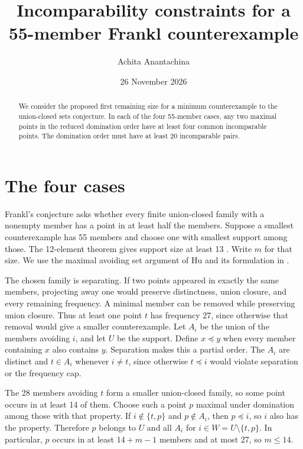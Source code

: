 \documentclass[10pt]{article}
\title{Incomparability constraints for a 55-member Frankl counterexample}
\author{Achita Anantachina}
\date{26 November 2026}
\begin{document}
\maketitle
\begin{abstract}
We consider the proposed first remaining size for a minimum
counterexample to the union-closed sets conjecture. In each of the
four 55-member cases, any two maximal points in the reduced domination
order have at least four common incomparable points. The domination
order must have at least 20 incomparable pairs.
\end{abstract}

\section{The four cases}
Frankl's conjecture asks whether every finite union-closed family with
a nonempty member has a point in at least half the members. Suppose a
smallest counterexample has 55 members and choose one with smallest
support among those. The 12-element theorem gives support size at
least 13 \cite{vuckovic}. Write \(m\) for that size. We use the maximal
avoiding set argument of Hu and its formulation in \cite{bhattacharjee}.

The chosen family is separating. If two points appeared in exactly
the same members, projecting away one would preserve distinctness,
union closure, and every remaining frequency. A minimal member can
be removed while preserving union closure. Thus at least one point
\(t\) has frequency 27, since otherwise that removal would give a
smaller counterexample. Let \(A_i\) be the union of the members avoiding
\(i\), and let \(U\) be the support. Define \(x\preceq y\) when every
member containing \(x\) also contains \(y\). Separation makes this a
partial order. The \(A_i\) are distinct and \(t\in A_i\) whenever
\(i\ne t\), since otherwise \(t\preceq i\) would violate separation
or the frequency cap.

The 28 members avoiding \(t\) form a smaller union-closed family, so
some point occurs in at least 14 of them. Choose such a point \(p\)
maximal under domination among those with that property. If
\(i\notin\{t,p\}\) and \(p\notin A_i\), then \(p\preceq i\), so \(i\)
also has the property. Therefore \(p\) belongs to \(U\) and all
\(A_i\) for \(i\in W=U\setminus\{t,p\}\). In particular, \(p\)
occurs in at least \(14+m-1\) members and at most 27, so \(m\le14\).
\end{document}
